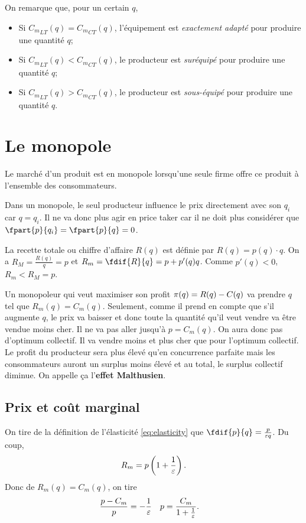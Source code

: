 On remarque que, pour un certain $q$,
\begin{itemize}
  \item Si ${C_m}_{LT}(q) = {C_m}_{CT}(q)$,
    l'équipement est \emph{exactement adapté} pour produire une quantité $q$;
  \item Si ${C_m}_{LT}(q) < {C_m}_{CT}(q)$,
    le producteur est \emph{suréquipé} pour produire une quantité $q$;
  \item Si ${C_m}_{LT}(q) > {C_m}_{CT}(q)$,
    le producteur est \emph{sous-équipé} pour produire une quantité $q$.
\end{itemize}

\section{Le monopole}
Le marché d'un produit est en monopole lorsqu'une seule firme
offre ce produit à l'ensemble des consommateurs.

Dans un monopole,
le seul producteur influence le prix directement avec son $q_i$ car $q = q_i$.
Il ne va donc plus agir en price taker car il ne doit plus
considérer que $\fpart{p}{q_i} = \fpart{p}{q} = 0$.

La recette totale ou chiffre d'affaire $R(q)$ est définie par
$R(q) = p(q) \cdot q$.
On a $R_M = \frac{R(q)}{q} = p$ et $R_m = \fdif{R}{q} = p + p'(q)q$.
Comme $p'(q) < 0$, $R_m < R_M = p$.

Un monopoleur qui veut maximiser son profit $\pi(q) = R(q) - C(q)$
va prendre $q$ tel que $R_m(q) = C_m(q)$.
Seulement, comme il prend en compte que s'il augmente $q$,
le prix va baisser et donc toute la quantité qu'il veut vendre va être vendue
moins cher.
Il ne va pas aller jusqu'à $p = C_m(q)$. On aura donc pas d'optimum collectif.
Il va vendre moins et plus cher que pour l'optimum collectif.
Le profit du producteur sera plus élevé qu'en concurrence parfaite mais
les consommateurs auront un surplus moins élevé et au total, le surplus
collectif diminue.
On appelle ça l'\textbf{effet Malthusien}.


\subsection{Prix et coût marginal}
On tire de la définition de l'élasticité \eqref{eq:elasticity} que
$\fdif{p}{q} = \frac{p}{\elasticity q}$. Du coup,
\[ R_m = p\left(1+\frac{1}{\varepsilon}\right). \]
Donc de $R_m(q) = C_m(q)$, on tire
\begin{align*}
  \frac{p-C_m}{p} & = -\frac{1}{\varepsilon} &
  p & = \frac{C_m}{1+\frac{1}{\varepsilon}}.
\end{align*}

